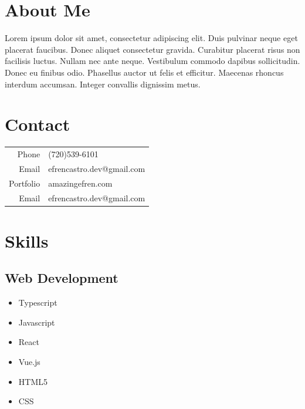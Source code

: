 \documentclass[11pt,oneside,a4paper,titlepage]{article}
\begin{document}
\begin{tcolorbox}
  \begin{minipage}[t]{9cm}
    \vspace*{-0.5cm}
    \begin{tcolorbox}[grow to left by=0.55cm,colback=themeBorder,colframe=white,arc=0mm,]
      \section*{About Me}
        Lorem ipsum dolor sit amet, consectetur adipiscing elit. Duis pulvinar neque eget placerat faucibus. Donec aliquet consectetur gravida. Curabitur placerat risus non facilisis luctus. Nullam nec ante neque. Vestibulum commodo dapibus sollicitudin. Donec eu finibus odio. Phasellus auctor ut felis et efficitur. Maecenas rhoncus interdum accumsan. Integer convallis dignissim metus.  
      \section*{Contact}
      \begin{tabular}{r l}
        Phone & (720)539-6101 \\
        Email & efrencastro.dev@gmail.com \\
        Portfolio & amazingefren.com \\
        Email & efrencastro.dev@gmail.com
      \end{tabular}
      \section*{Skills}
      \subsection*{Web Development}
      \begin{itemize}
        \setlength\itemsep{0em}
        \item{Typescript}
        \item{Javascript}
        \item{React}
        \item{Vue.js}
        \item{HTML5}
        \item{CSS}
      \end{itemize}

\end{tcolorbox}
\end{minipage}
\end{tcolorbox}
\end{document}
